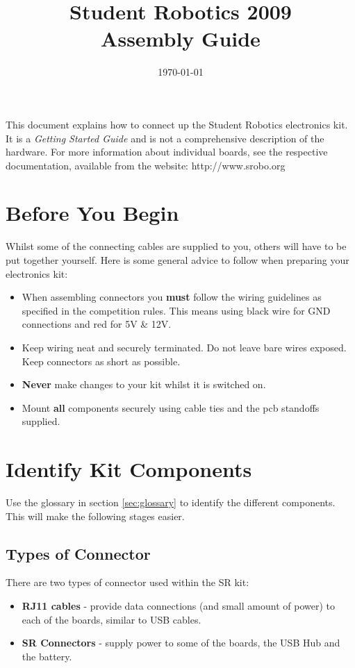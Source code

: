 \documentclass[a4paper, 12pt]{article}
\title {Student Robotics 2009\\ Assembly Guide}
\date{\today}
\begin{document}
\maketitle

\noindent This document explains how to connect up the Student Robotics electronics kit. It is a \textit{Getting Started Guide} and is not a comprehensive description of the hardware. For more information about individual boards, see the respective documentation, available from the website: http://www.srobo.org 

\section{Before You Begin}

Whilst some of the connecting cables are supplied to you, others will have to be put together yourself. Here is some general advice to follow when preparing your electronics kit:
\begin{itemize}
\item When assembling connectors you \textbf{must} follow the wiring guidelines as specified in the competition rules. This means using black wire for GND connections and red for 5V \& 12V. 
\item Keep wiring neat and securely terminated. Do not leave bare wires exposed. Keep connectors as short as possible.
\item \textbf{Never} make changes to your kit whilst it is switched on.
\item Mount \textbf{all} components securely using cable ties and the pcb standoffs supplied.

\end{itemize}


\section{Identify Kit Components}
Use the glossary in section \ref{sec:glossary} to identify the different components. This will make the following stages easier.
\subsection{Types of Connector}
There are two types of connector used within the SR kit: 
\begin{itemize}
\item \textbf{RJ11 cables} - provide data connections (and small amount of power) to each of the boards, similar to USB cables. 
\item \textbf{SR Connectors} - supply power to some of the boards, the USB Hub and the battery.
\end{itemize} 
\end{document}

